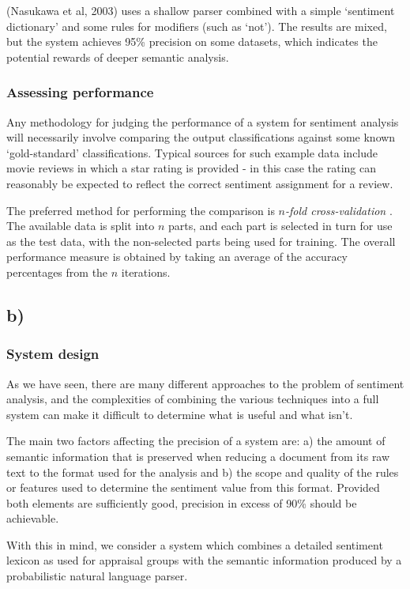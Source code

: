 \documentclass[11pt]{article}
\begin{document}
(Nasukawa et al, 2003)\cite{Nasukawa 2003} uses a shallow parser combined with
a simple `sentiment dictionary' and some rules for modifiers (such as `not').
The results are mixed, but the system achieves 95\% precision on some datasets,
which indicates the potential rewards of deeper semantic analysis.

\subsubsection*{Assessing performance}

Any methodology for judging the performance of a system for sentiment analysis
will necessarily involve comparing the output classifications against some
known `gold-standard' classifications. Typical sources for such example data
include movie reviews in which a star rating is provided - in this case the
rating can reasonably be expected to reflect the correct sentiment assignment
for a review.

The preferred method for performing the comparison is \emph{ $n$-fold
cross-validation }. The available data is split into $n$ parts, and each part
is selected in turn for use as the test data, with the non-selected parts being
used for training. The overall performance measure is obtained by taking an
average of the accuracy percentages from the $n$ iterations.

\subsection*{b)}

\subsubsection*{System design}

As we have seen, there are many different approaches to the problem of
sentiment analysis, and the complexities of combining the various techniques
into a full system can make it difficult to determine what is useful and what
isn't.

The main two factors affecting the precision of a system are: a) the amount of
semantic information that is preserved when reducing a document from its raw
text to the format used for the analysis and b) the scope and quality of the
rules or features used to determine the sentiment value from this format.
Provided both elements are sufficiently good, precision in excess of 90\%
should be achievable.

With this in mind, we consider a system which combines a detailed sentiment
lexicon as used for appraisal groups\cite{Whitelaw2005} with the semantic
information produced by a probabilistic natural language parser.
\end{document}
